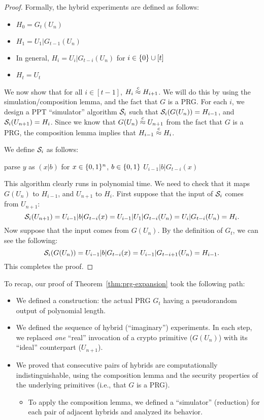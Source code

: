 \documentclass[11pt]{article}
\begin{document}
\begin{proof}
  Formally, the hybrid experiments are defined as follows:
  \begin{itemize}
  \item $H_0 = G_t(U_n)$
  \item $H_1 = U_1 | G_{t-1}(U_n)$
  \item In general, $H_i = U_i | G_{t-i}(U_n)$ for $i \in \{0\} \cup
    [t]$
  \item $H_t = U_{t}$
  \end{itemize}

  We now show that for all $i \in [t-1]$, $H_i \stackrel{c}{\approx} H_{i+1}$.  We
  will do this by using the simulation/composition lemma, and the fact
  that $G$ is a PRG.  For each $i$, we design a PPT ``simulator''
  algorithm $\mathcal{S}_i$ such that $\mathcal{S}_i(G(U_n))=H_{i-1}$, and
  $\mathcal{S}_i(U_{n+1})=H_i$.  Since we know that $G(U_n) \stackrel{c}{\approx} U_{n+1}$
  from the fact that $G$ is a PRG, the composition lemma implies that
  $H_{i-1} \stackrel{c}{\approx} H_i$.

  We define $\mathcal{S}_i$ as follows:
  \begin{algorithm}[h]
    \caption{$\Sim_i(y \in \bit^{n+1})$}
    \begin{algorithmic}
      \STATE parse $y$ as $(x|b)$ for $x \in \{0,1\}^{n}$, $b \in \{0,1\}$
      \RETURN $U_{i-1} | b | G_{t-i}(x)$
    \end{algorithmic}
  \end{algorithm}

  This algorithm clearly runs in polynomial time.  We need to check
  that it maps $G(U_n)$ to $H_{i-1}$, and $U_{n+1}$ to $H_i$.  First
  suppose that the input of $\mathcal{S}_i$ comes from $U_{n+1}$:
  \[ \mathcal{S}_i(U_{n+1})= U_{i-1} | b | G_{t-i}(x) = U_{i-1} | U_1 |
  G_{t-i}(U_n)=U_i | G_{t-i}(U_n) = H_i. \] Now suppose that the input
  comes from $G(U_n)$.  By the definition of $G_t$, we can see the
  following:
  \[ \mathcal{S}_i(G(U_n)) = U_{i-1} | b | G_{t-i}(x) = U_{i-1} |
  G_{t-i+1}(U_n)=H_{i-1}. \]
  This completes the proof.
\end{proof}

\noindent To recap, our proof of Theorem~\ref{thm:prg-expansion} took
the following path:
\begin{itemize}
\item We defined a construction: the actual PRG $G_t$ having a
  pseudorandom output of polynomial length.
\item We defined the sequence of hybrid (``imaginary'') experiments.
  In each step, we replaced \emph{one} ``real'' invocation of a crypto
  primitive ($G(U_{n})$) with its ``ideal'' counterpart ($U_{n+1}$).
\item We proved that consecutive pairs of hybrids are computationally
  indistinguishable, using the composition lemma and the security
  properties of the underlying primitives (i.e., that $G$ is a PRG).
  \begin{itemize}
  \item To apply the composition lemma, we defined a
    ``simulator'' (reduction) for each pair of adjacent hybrids and
    analyzed its behavior.
  \end{itemize}
\end{itemize}
\end{document}

